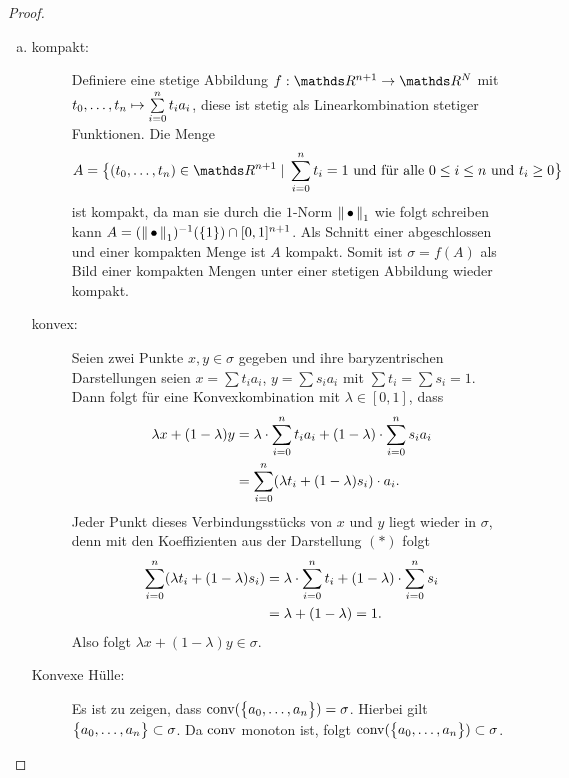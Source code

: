 \begin{Satz}
\begin{proof}
\begin{enumerate}[(a):]
    \item 
      \begin{description}
      \item[kompakt:] Definiere eine stetige Abbildung
        $f : \R^{n+1} \rightarrow \R^N$ mit
        $ t_0,\ldots ,t_n \mapsto \sp{0}{n} t_i a_i$, diese ist stetig
        als Linearkombination stetiger Funktionen.  Die Menge
        \begin{gather*}
          A= \bigl\{ (t_0,\ldots,t_n) \in \R^{n+1} \; | \;  \sp{0}{n} t_i = 1
            \text{ und für alle } 0 \leq i \leq n \text{ und } t_i \geq 0 \bigr\}
        \end{gather*}
        ist kompakt, da man sie durch die $1$-Norm $\nn_1$ wie folgt
        schreiben kann $A = (\nn_1)^{-1}(\{ 1 \}) \cap
        [0,1]^{n+1}$.
        Als Schnitt einer abgeschlossen und einer kompakten Menge ist
        $A$ kompakt.  Somit ist $\sigma = f(A)$ als Bild einer
        kompakten Mengen unter einer stetigen Abbildung wieder
        kompakt.
      \item[konvex:] Seien zwei Punkte $x,y \in \sigma$ gegeben und
        ihre baryzentrischen Darstellungen seien $x = \sum t_i a_i$,
        $y = \sum s_i a_i$ mit $\sum t_i = \sum s_i = 1$. Dann folgt
        für eine Konvexkombination mit $\lambda \in [0,1]$, dass
        \renewcommand*{\theequation}{$*$}
        \begin{align}
          \nonumber
          \lambda x + (1- \lambda)y &= \lambda \cdot \sp{0}{n} t_i a_i%
                                      + (1-\lambda) \cdot \sp{0}{n} s_i a_i \\
                                    &= \sp{0}{n} (\lambda t_i +%
                                      (1-\lambda) s_i) \cdot a_i.
        \end{align}
        Jeder Punkt dieses Verbindungsstücks von $x$ und $y$ liegt
        wieder in $\sigma$, denn mit den Koeffizienten aus der
        Darstellung $(*)$ folgt
        \begin{align*}
          \sp{0}{n} (\lambda t_i + (1-\lambda) s_i)
          &= \lambda \cdot \sp{0}{n} t_i + (1-\lambda) \cdot \sp{0}{n} s_i \\
          &= \lambda + (1 - \lambda) = 1.
        \end{align*}
        Also folgt $\lambda x + (1- \lambda)y \in \sigma$.  

      \item[Konvexe Hülle:] Es ist zu zeigen, dass
        $\conv(\sset{a_0,\ldots , a_n}) = \sigma$. Hierbei gilt
        $\sset{a_0,\ldots,a_n} \subset \sigma$. Da $\conv$ monoton
        ist, folgt $\conv(\sset{a_0,\ldots , a_n}) \subset \sigma$.
        

\end{description}
\end{enumerate}
\end{proof}
\end{Satz}
